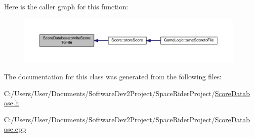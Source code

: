 Here is the caller graph for this function\+:\nopagebreak
\begin{figure}[H]
\begin{center}
\leavevmode
\includegraphics[width=350pt]{class_score_database_a8e479ebb5c08413a4f34c9b0d019ff0e_icgraph}
\end{center}
\end{figure}


The documentation for this class was generated from the following files\+:\begin{DoxyCompactItemize}
\item 
C\+:/\+Users/\+User/\+Documents/\+Software\+Dev2\+Project/\+Space\+Rider\+Project/\hyperlink{_score_database_8h}{Score\+Database.\+h}\item 
C\+:/\+Users/\+User/\+Documents/\+Software\+Dev2\+Project/\+Space\+Rider\+Project/\hyperlink{_score_database_8cpp}{Score\+Database.\+cpp}\end{DoxyCompactItemize}
